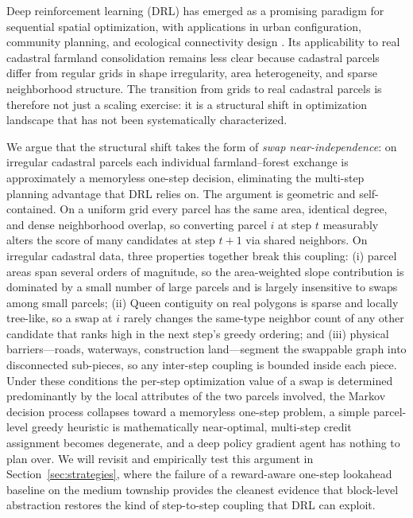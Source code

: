 \documentclass[preprint,12pt]{elsarticle}
\begin{document}
Deep reinforcement learning (DRL) has emerged as a promising paradigm for sequential spatial optimization, with applications in urban configuration, community planning, and ecological connectivity design \citep{wang2021deep, zheng2023spatial, equihua2024conservation}. Its applicability to real cadastral farmland consolidation remains less clear because cadastral parcels differ from regular grids in shape irregularity, area heterogeneity, and sparse neighborhood structure. The transition from grids to real cadastral parcels is therefore not just a scaling exercise: it is a structural shift in optimization landscape that has not been systematically characterized.

We argue that the structural shift takes the form of \textit{swap near-independence}: on irregular cadastral parcels each individual farmland--forest exchange is approximately a memoryless one-step decision, eliminating the multi-step planning advantage that DRL relies on. The argument is geometric and self-contained. On a uniform grid every parcel has the same area, identical degree, and dense neighborhood overlap, so converting parcel $i$ at step $t$ measurably alters the score of many candidates at step $t{+}1$ via shared neighbors. On irregular cadastral data, three properties together break this coupling: (i) parcel areas span several orders of magnitude, so the area-weighted slope contribution is dominated by a small number of large parcels and is largely insensitive to swaps among small parcels; (ii) Queen contiguity on real polygons is sparse and locally tree-like, so a swap at $i$ rarely changes the same-type neighbor count of any other candidate that ranks high in the next step's greedy ordering; and (iii) physical barriers---roads, waterways, construction land---segment the swappable graph into disconnected sub-pieces, so any inter-step coupling is bounded inside each piece. Under these conditions the per-step optimization value of a swap is determined predominantly by the local attributes of the two parcels involved, the Markov decision process collapses toward a memoryless one-step problem, a simple parcel-level greedy heuristic is mathematically near-optimal, multi-step credit assignment becomes degenerate, and a deep policy gradient agent has nothing to plan over. We will revisit and empirically test this argument in Section~\ref{sec:strategies}, where the failure of a reward-aware one-step lookahead baseline on the medium township provides the cleanest evidence that block-level abstraction restores the kind of step-to-step coupling that DRL can exploit.
\end{document}
